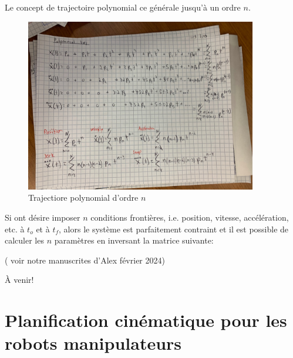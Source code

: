 Le concept de trajectoire polynomial ce générale jusqu'à un ordre $n$.

\begin{figure}[ht]
        \centering
		\includegraphics[width=0.90\textwidth]{fig/polynomial_traj_draft.jpg}
        \caption{Trajectiore polynomial d'ordre $n$}
		\label{fig:poly_n}
\end{figure}

Si ont désire imposer $n$ conditions frontières, i.e. position, vitesse, accélération, etc. à $t_o$ et à $t_f$, alors le système est parfaitement contraint et il est possible de calculer les $n$ paramètres en inversant la matrice suivante:

( voir notre manuscrites d'Alex février 2024)

À venir!




\newpage
\section{Planification cinématique pour les robots manipulateurs}




